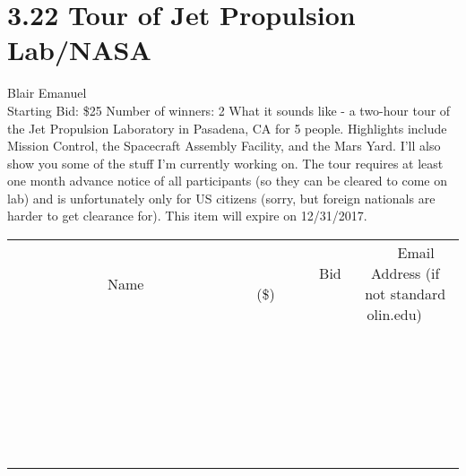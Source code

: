 \documentclass[11pt]{article}
\begin{document}
\section*{3.22 Tour of Jet Propulsion Lab/NASA}
Blair Emanuel
\\
Starting Bid: \$25
\newline
Number of winners: 2
\newline
What it sounds like - a two-hour tour of the Jet Propulsion Laboratory in Pasadena, CA for 5 people. Highlights include Mission Control, the Spacecraft Assembly Facility, and the Mars Yard. I'll also show you some of the stuff I'm currently working on. The tour requires at least one month advance notice of all participants (so they can be cleared to come on lab) and is unfortunately only for US citizens (sorry, but foreign nationals are harder to get clearance for). This item will expire on 12/31/2017.
\\[6ex]
\begin{tabular}{c c c}
~~~~~~~~~~~~~Name~~~~~~~~~~~~~ & ~~~~~~~~~Bid (\$)~~~~~~~~~  & ~~~Email Address (if not standard olin.edu)~~~\\
 & & \\
\hline
 & & \\
\hline
 & & \\
\hline
 & & \\
\hline
 & & \\
\hline
 & & \\
\hline
 & & \\
\hline
 & & \\
\hline
 & & \\
\hline
 & & \\
\hline
 & & \\
\hline
 & & \\
\hline
 & & \\
\hline
 & & \\
\hline
 & & \\
\hline
 & & \\
\hline
 & & \\
\hline
 & & \\
\hline
 & & \\
\hline
 & & \\
\hline
 & & \\
\hline
 & & \\
\hline
 & & \\
\hline
 & & \\
\hline
 & & \\
\hline
 & & \\
\hline
\end{tabular}
\newpage
\end{document}
